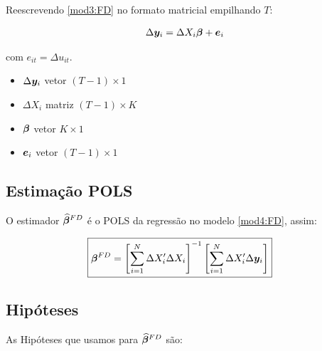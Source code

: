 \documentclass[11pt, oneside, a4paper, article]{article}
\numberwithin{equation}{section}
\begin{document}
Reescrevendo \eqref{mod3:FD} no formato matricial empilhando $T$:

\vspace{-1 em}
\begin{align} \label{mod4:FD}
	\Delta \boldsymbol{y}_{i} = \Delta X_{i} \boldsymbol{\beta} + \boldsymbol{e}_{i}
\end{align}

\noindent
com 
$\boxed{e_{it} = \Delta u_{it}}$.

\begin{itemize}\itemsep0pt
\item
$\Delta \boldsymbol{y}_{i}$ vetor $( T - 1 ) \times 1$ 
\item
$\Delta X_{i}$  matriz  $( T - 1 ) \times K$
\item
$\boldsymbol{\beta}$ vetor $K \times 1$
\item
$\boldsymbol{e}_{i}$ vetor $(T - 1 ) \times 1$
\end{itemize}


\subsection{Estimação POLS}

O estimador $\widehat{\boldsymbol{\beta}}^{FD}$ é o POLS da regressão no modelo \eqref{mod4:FD}, assim:

\vspace{-1 em}
\begin{align} \label{beta:pols:FD}
\Aboxed{
\betavec^{FD} =
\left[ \sum_{i=1}^{N} \Delta X_{i}' \Delta X_{i} \right]^{-1}
\left[ \sum_{i=1}^{N} \Delta X_{i}' \Delta \yvec_{i} \right]
}
\end{align}

\subsection{Hipóteses}

As Hipóteses que usamos para $\widehat{\boldsymbol{\beta}}^{FD}$ são:
\end{document}
